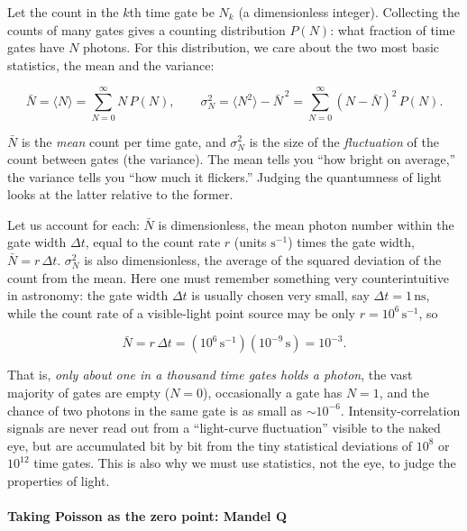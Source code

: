 Let the count in the \(k\)th time gate be \(N_k\) (a dimensionless integer). Collecting the counts of many gates gives a counting distribution \(P(N)\): what fraction of time gates have \(N\) photons. For this distribution, we care about the two most basic statistics, the mean and the variance:

\begin{equation}
  \bar N=\langle N\rangle=\sum_{N=0}^{\infty}N\,P(N),
  \qquad
  \sigma_N^2=\big\langle N^2\big\rangle-\bar N^{\,2}
  =\sum_{N=0}^{\infty}(N-\bar N)^2\,P(N).
  \label{eq:e07-mean-var}
\end{equation}
\begin{formulaexplain}
\(\bar N\) is the \emph{mean} count per time gate, and \(\sigma_N^2\) is the size of the \emph{fluctuation} of the count between gates (the variance). The mean tells you ``how bright on average,'' the variance tells you ``how much it flickers.'' Judging the quantumness of light looks at the latter relative to the former.
\end{formulaexplain}

Let us account for each: \(\bar N\) is dimensionless, the mean photon number within the gate width \(\Delta t\), equal to the count rate \(r\) (units \(\mathrm{s^{-1}}\)) times the gate width, \(\bar N=r\,\Delta t\). \(\sigma_N^2\) is also dimensionless, the average of the squared deviation of the count from the mean. Here one must remember something very counterintuitive in astronomy: the gate width \(\Delta t\) is usually chosen very small, say \(\Delta t=1\,\mathrm{ns}\), while the count rate of a visible-light point source may be only \(r=10^6\,\mathrm{s^{-1}}\), so

\[
  \bar N=r\,\Delta t=(10^6\,\mathrm{s^{-1}})(10^{-9}\,\mathrm{s})=10^{-3}.
\]

That is, \emph{only about one in a thousand time gates holds a photon}, the vast majority of gates are empty (\(N=0\)), occasionally a gate has \(N=1\), and the chance of two photons in the same gate is as small as \(\sim10^{-6}\). Intensity-correlation signals are never read out from a ``light-curve fluctuation'' visible to the naked eye, but are accumulated bit by bit from the tiny statistical deviations of \(10^8\) or \(10^{12}\) time gates. This is also why we must use statistics, not the eye, to judge the properties of light.

\paragraph{Taking Poisson as the zero point: Mandel Q}
\label{sec:e07-mandel-q}

